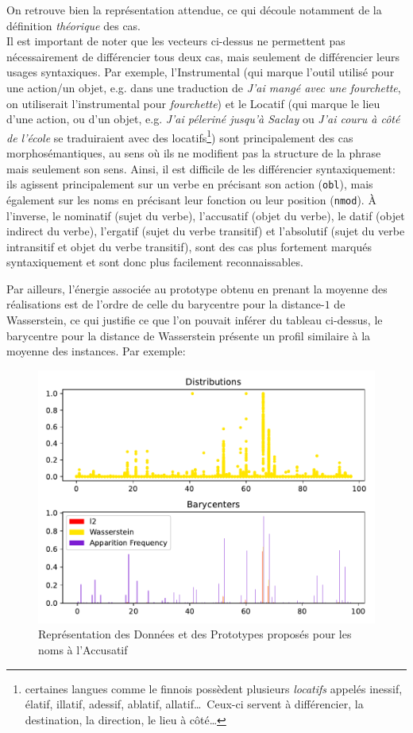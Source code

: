 \documentclass{cours}
\begin{document}
On retrouve bien la représentation attendue, ce qui découle notamment de la définition \emph{théorique} des cas. \\
Il est important de noter que les vecteurs ci-dessus ne permettent pas nécessairement de différencier tous deux cas, mais seulement de différencier leurs usages syntaxiques.
Par exemple, l'Instrumental (qui marque l'outil utilisé pour une action/un objet, e.g. dans une traduction de \textsl{J'ai mangé \emph{avec} une fourchette}, on utiliserait l'instrumental pour \textsl{fourchette})
et le Locatif (qui marque le lieu d'une action, ou d'un objet, e.g. \textsl{J'ai péleriné jusqu'à Saclay} ou \textsl{J'ai couru à côté de l'école} se traduiraient avec des locatifs\footnote{certaines langues comme le finnois possèdent plusieurs \textit{locatifs} appelés inessif, élatif, illatif, adessif, ablatif, allatif\dots\ Ceux-ci servent à différencier, la destination, la direction, le lieu à côté\ldots}) sont principalement des cas morphosémantiques, au sens où ils ne modifient pas la structure de la phrase mais seulement son sens.
Ainsi, il est difficile de les différencier syntaxiquement: ils agissent principalement sur un verbe en précisant son action (\texttt{obl}), mais également sur les noms en précisant leur fonction ou leur position (\texttt{nmod}).
À l'inverse, le nominatif (sujet du verbe), l'accusatif (objet du verbe), le datif (objet indirect du verbe), l'ergatif (sujet du verbe transitif) et l'absolutif (sujet du verbe intransitif et objet du verbe transitif), sont des cas plus fortement marqués syntaxiquement et sont donc plus facilement reconnaissables.

\medskip
Par ailleurs, l'énergie associée au prototype obtenu en prenant la moyenne des réalisations est de l'ordre de celle du barycentre pour la distance-$1$ de Wasserstein, ce qui justifie ce que l'on pouvait inférer du tableau ci-dessus, le barycentre pour la distance de Wasserstein présente un profil similaire à la moyenne des instances.
Par exemple:

\begin{figure}[H]
\centering
\includegraphics{Figures/Visualisations/Nouns_Wasserstein_Barycenter_Acc}
\caption{Représentation des Données et des Prototypes proposés pour les noms à l'Accusatif}
\end{figure}
\end{document}
